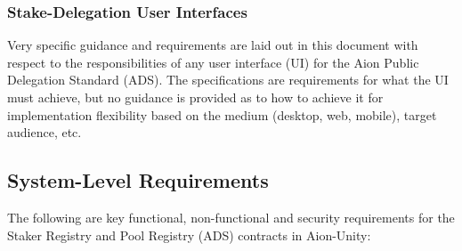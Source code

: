 \subsubsection{Stake-Delegation User Interfaces}
Very specific guidance and requirements are laid out in this document with respect to the responsibilities of any user interface (UI) for the Aion Public Delegation Standard (ADS). The specifications are requirements for what the UI must achieve, but no guidance is provided as to how to achieve it for implementation flexibility based on the medium (desktop, web, mobile), target audience, etc. 

\subsection{System-Level Requirements}

The following are key functional, non-functional and security requirements for the Staker Registry and Pool Registry (ADS) contracts in Aion-Unity:

